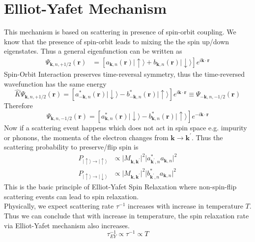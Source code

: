\documentclass[aps,prb,onecolumn,notitlepage,showpacs,floatfix,superscriptaddress]{revtex4-1}
\begin{document}
\section{Elliot-Yafet Mechanism}
This mechanism is based on scattering in presence of spin-orbit coupling. We know that the presence of spin-orbit leads to mixing the the spin up/down eigenstates. Thus a general eigenfunction can be written as
\begin{equation}
\begin{split}
 \Psi_{{\bm k},n,+1/2} ({\bm r}) &= \left[a_{{\bm k},n}({\bm r}) \vert\uparrow \rangle +b_{{\bm k},n}({\bm r}) \vert\downarrow \rangle \right] e^{i{\bm k}\cdot{\bm r}} 
\end{split}
\end{equation}
Spin-Orbit Interaction preserves time-reversal symmetry, thus the time-reversed wavefunction has the same energy
\begin{equation}
\hat{K}\Psi_{{\bm k},n,+1/2} ({\bm r}) = \left[a^{*}_{-{\bm k},n}({\bm r}) \vert\downarrow \rangle - b^{*}_{-{\bm k},n}({\bm r}) \vert\uparrow \rangle \right] e^{i{\bm k}\cdot{\bm r}} \equiv \Psi_{-{\bm k},n,-1/2} ({\bm r})  
\end{equation}
Therefore
\begin{equation}
\Psi_{{\bm k},n,-1/2} ({\bm r})  = \left[a^{*}_{{\bm k},n}({\bm r}) \vert\downarrow \rangle - b^{*}_{{\bm k},n}({\bm r}) \vert\uparrow \rangle \right] e^{-i{\bm k}\cdot{\bm r}} 
\end{equation}
Now if a scattering event happens which does not act in spin space e.g. impurity or phonons, the momenta of the electron changes from ${\bm k} \rightarrow {\bm k}^\prime$. Thus the scattering probability to preserve/flip spin is
\begin{equation}
\begin{split}
P_{\vert\uparrow \rangle\rightarrow\vert\uparrow \rangle} &\propto \vert M_{{\bm k} ,{\bm k}^\prime} \vert^2 \vert a^*_{{\bm k}^\prime,n} a_{{\bm k},n}\vert^2 \\
P_{\vert\uparrow \rangle\rightarrow\vert\downarrow \rangle} &\propto \vert M_{{\bm k} ,{\bm k}^\prime} \vert^2 \vert b^*_{{\bm k}^\prime,n} a_{{\bm k},n}\vert^2
\end{split}
\end{equation}
This is the basic principle of Elliot-Yafet Spin Relaxation where non-spin-flip scattering events can lead to spin relaxation. \\
%
Physically, we expect scattering rate $\tau^{-1}$ increases with increase in temperature $T$. Thus we can conclude that with increase in temperature, the spin relaxation rate via Elliot-Yafet mechanism also increases.
\begin{equation}
\tau_{EY}^{-1} \propto \tau^{-1} \propto T
\end{equation}
\end{document}
